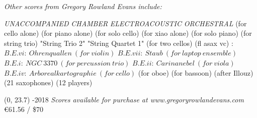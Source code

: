 \documentclass[10pt]{article}
\begin{document}

\vspace*{4\baselineskip}
\begin{center}
\textit{\fontsize{.7cm}{1em}\selectfont Other scores from Gregory Rowland Evans include:} \hfill
\end{center}
\vspace*{6\baselineskip}
{
\begin{center}
\setlength{\columnseprule}{1pt}
\setlength{\columnsep}{3em}

\begin{paracol}{4}
\textit{\fontsize{.4cm}{1em}\selectfont UNACCOMPANIED}
\switchcolumn[1]
\textit{\fontsize{.4cm}{1em}\selectfont CHAMBER}
\switchcolumn[2]
\textit{\fontsize{.4cm}{1em}\selectfont ELECTROACOUSTIC}
\switchcolumn[3]
\textit{\fontsize{.4cm}{1em}\selectfont ORCHESTRAL}
\switchcolumn[0]
\fontsize{.08cm}{0.2em}  (for cello alone)
\switchcolumn[0]
\fontsize{.08cm}{0.2em}  (for piano alone)
\switchcolumn[0]
\fontsize{.08cm}{0.2em}  (for solo cello)
 \switchcolumn[0]
\fontsize{.08cm}{0.2em}  (for xiao alone)
  \switchcolumn[0]
\fontsize{.08cm}{0.2em}  (for solo piano)
\switchcolumn[1]
\fontsize{.08cm}{0.2em} 
\switchcolumn[1]
\fontsize{.08cm}{0.2em} 
\switchcolumn[1]
\fontsize{.08cm}{0.2em}  (for string trio)
\switchcolumn[1]
\fontsize{.08cm}{0.2em}  "String Trio 2"
\switchcolumn[1]
\fontsize{.08cm}{0.2em}  "String Quartet 1"
\switchcolumn[1]
\fontsize{.08cm}{0.2em}  (for two cellos)
\switchcolumn[1]
\fontsize{.08cm}{0.2em}  (fl asax vc)
\switchcolumn[2]
\fontsize{.08cm}{0.2em} :
\switchcolumn[2]
\fontsize{.04cm}{0.2em} $B.E.vi: \ Ohrenquallen \ (for \ violin)$
\switchcolumn[2]
\fontsize{.04cm}{0.2em} $B.E.vii: \ Staub \ (for \ laptop \ ensemble)$
\switchcolumn[2]
\fontsize{.04cm}{0.2em} $B.E.i: \ NGC \ 3370 \ (for \ percussion \ trio)$
\switchcolumn[2]
\fontsize{.04cm}{0.2em} $B.E.ii: \ Carinanebel \ (for \ viola)$
\switchcolumn[2]
\fontsize{.04cm}{0.2em} $B.E.iv: \ Arborealkartographie \ (for \ cello)$
\switchcolumn[2]
\fontsize{.08cm}{0.2em}  (for oboe)
\switchcolumn[2]
\fontsize{.08cm}{0.2em}  (for bassoon)
\switchcolumn[3]
\fontsize{.08cm}{0.2em} 
\switchcolumn[3]
\fontsize{.08cm}{0.2em}  (after Illouz)
\switchcolumn[3]
\fontsize{.08cm}{0.2em}  (21 saxophones)
\switchcolumn[3]
\fontsize{.08cm}{0.2em}  (12 players)


\end{paracol}
\end{center}
}

\begin{textblock}{23}(0, 23.7)
-2018 \hfill
\textit{Scores available for purchase at www.gregoryrowlandevans.com} \hfill
\euro 61.56 / \$70
\end{textblock}
\end{document}
